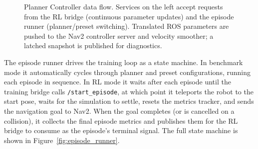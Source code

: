 \documentclass[conference]{IEEEtran}
\begin{document}
        \begin{figure}[H]
        \centering
        \caption{Planner Controller data flow. Services on the left accept requests from the RL bridge (continuous parameter updates) and the episode runner (planner/preset switching). Translated ROS parameters are pushed to the Nav2 controller server and velocity smoother; a latched snapshot is published for diagnostics.}
        \label{fig:planner_ctrl}
        \end{figure}

        The episode runner drives the training loop as a state machine. In benchmark mode it automatically cycles through planner and preset configurations,
        running each episode in sequence. In RL mode it waits after each episode until the training bridge calls \texttt{/start\_episode}, at which point
        it teleports the robot to the start pose, waits for the simulation to settle, resets the metrics tracker, and sends the navigation goal to Nav2.
        When the goal completes (or is cancelled on a collision), it collects the final episode metrics and publishes them for the RL bridge to consume
        as the episode's terminal signal. The full state machine is shown in Figure~\ref{fig:episode_runner}.
\end{document}
